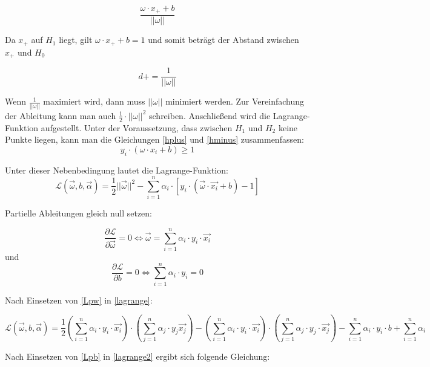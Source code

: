 \documentclass[11pt,ceqn]{book}
\begin{document}
$$\frac{\omega \cdot x_+ +b}{||\omega||}$$

Da $x_+$ auf $H_1$ liegt, gilt $\omega \cdot x_+ +b = 1$ und somit beträgt der Abstand zwischen $x_+$ und $H_0$ 

$$d+ = \frac{1}{||\omega||}$$

Wenn $\frac{1}{||\omega||}$ maximiert wird, dann muss $||\omega||$ minimiert werden. Zur Vereinfachung der Ableitung kann man auch $\frac{1}{2} \cdot ||\omega||^2$ schreiben. Anschließend wird die Lagrange-Funktion aufgestellt. Unter der Voraussetzung, dass zwischen $H_1$ und $H_2$ keine Punkte liegen, kann man die Gleichungen \eqref{hplus} und \eqref{hminus} zusammenfassen:
\begin{equation}
y_i \cdot (\omega \cdot x_i + b) \geqslant 1
\end{equation}

Unter dieser Nebenbedingung lautet die Lagrange-Funktion:
\begin{equation} \label{lagrange}
\mathcal{L}(\vec{\omega},b,\vec{\alpha}) = \frac{1}{2}||\vec{\omega}||^2 - \sum_{i=1}^n \alpha_i \cdot \left[y_i \cdot (\vec{\omega} \cdot \vec{x_i} + b) - 1\right]
\end{equation}

Partielle Ableitungen gleich null setzen:

\begin{equation} \label{Lpw}
\frac{\partial \mathcal{L}}{\partial \vec{\omega}} = 0 \Leftrightarrow \vec{\omega} = \sum_{i=1}^n \alpha_i \cdot y_i \cdot \vec{x_i}
\end{equation}
und
\begin{equation} \label{Lpb}
\frac{\partial \mathcal{L}}{\partial b} = 0 \Leftrightarrow \sum_{i=1}^n \alpha_i \cdot y_i = 0
\end{equation} 

Nach Einsetzen von \eqref{Lpw} in \eqref{lagrange}:

\begin{equation} \label{lagrange2}
\mathcal{L}(\vec{\omega},b,\vec{\alpha}) = \frac{1}{2}\left(\sum_{i=1}^n \alpha_i \cdot y_i \cdot \vec{x_i}\right)\cdot \left(\sum_{j=1}^n \alpha_j \cdot y_j \vec{x_j}\right) - \left(\sum_{i=1}^n \alpha_i \cdot y_i \cdot \vec{x_i}\right) \cdot \left(\sum_{j=1}^n \alpha_j \cdot y_j \cdot \vec{x_j}\right) - \sum_{i=1}^n \alpha_i \cdot y_i \cdot b + \sum_{i=1}^n \alpha_i
\end{equation}

Nach Einsetzen von \eqref{Lpb} in \eqref{lagrange2} ergibt sich folgende Gleichung:
\end{document}
